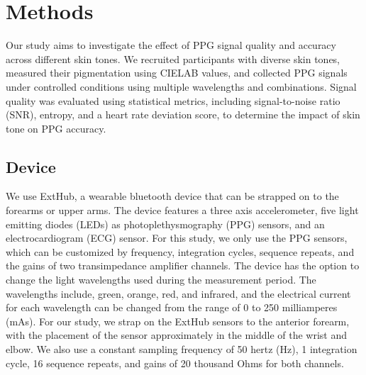 \documentclass[letterpaper, 10 pt, conference]{ieeeconf}  %
\begin{document}

\section{Methods}
Our study aims to investigate the effect of PPG signal quality and accuracy across different skin tones. We recruited participants with diverse skin tones, measured their pigmentation using CIELAB values, and collected PPG signals under controlled conditions using multiple wavelengths and combinations. Signal quality was evaluated using statistical metrics, including signal-to-noise ratio (SNR), entropy, and a heart rate deviation score, to determine the impact of skin tone on PPG accuracy.

\subsection{Device}
We use ExtHub, a wearable bluetooth device that can be strapped on to the forearms or upper arms. The device features a three axis accelerometer, five light emitting diodes (LEDs) as photoplethysmography (PPG) sensors, and an electrocardiogram (ECG) sensor. For this study, we only use the PPG sensors, which can be customized by frequency, integration cycles, sequence repeats, and the gains of two transimpedance amplifier channels. The device has the option to change the light wavelengths used during the measurement period. The wavelengths include, green, orange, red, and infrared, and the electrical current for each wavelength can be changed from the range of 0 to 250 milliamperes (mAs). For our study, we strap on the ExtHub sensors to the anterior forearm, with the placement of the sensor approximately in the middle of the wrist and elbow. We also use a constant sampling frequency of 50 hertz (Hz), 1 integration cycle, 16 sequence repeats, and gains of 20 thousand Ohms for both channels.
\end{document}
